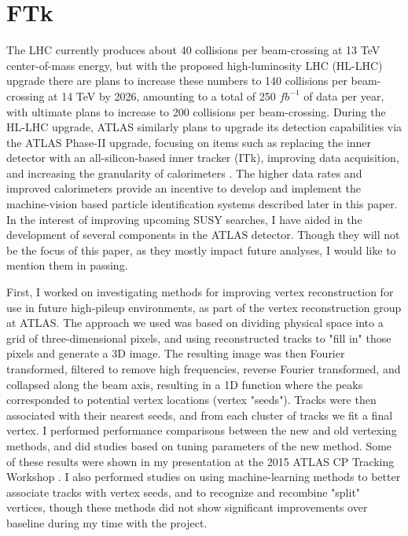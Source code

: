 \chapter{FTk}

The LHC currently produces about 40 collisions per beam-crossing at 13 TeV center-of-mass energy, but with the proposed high-luminosity LHC (HL-LHC) upgrade there are plans to increase these numbers to 140 collisions per beam-crossing at 14 TeV by 2026, amounting to a total of 250 $fb^{-1}$ of data per year, with ultimate plans to increase to 200 collisions per beam-crossing. During the HL-LHC upgrade, ATLAS similarly plans to upgrade its detection capabilities via the ATLAS Phase-II upgrade, focusing on items such as replacing the inner detector with an all-silicon-based inner tracker (ITk), improving data acquisition, and increasing the granularity of calorimeters \cite{ATLAS_phaseII}. The higher data rates and improved calorimeters provide an incentive to develop and implement the machine-vision based particle identification systems described later in this paper. In the interest of improving upcoming SUSY searches, I have aided in the development of several components in the ATLAS detector. Though they will not be the focus of this paper, as they mostly impact future analyses, I would like to mention them in passing.

First, I worked on investigating methods for improving vertex reconstruction for use in future high-pileup environments, as part of the vertex reconstruction group at ATLAS. The approach we used was based on dividing physical space into a grid of three-dimensional pixels, and using reconstructed tracks to "fill in" those pixels and generate a 3D image. The resulting image was then Fourier transformed, filtered to remove high frequencies, reverse Fourier transformed, and collapsed along the beam axis, resulting in a 1D function where the peaks corresponded to potential vertex locations (vertex "seeds"). Tracks were then associated with their nearest seeds, and from each cluster of tracks we fit a final vertex. I performed performance comparisons between the new and old vertexing methods, and did studies based on tuning parameters of the new method. Some of these results were shown in my presentation at the 2015 ATLAS CP Tracking Workshop \cite{vertex}. I also performed studies on using machine-learning methods to better associate tracks with vertex seeds, and to recognize and recombine "split" vertices, though these methods did not show significant improvements over baseline during my time with the project.

